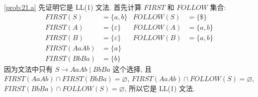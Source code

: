 \documentclass[boxes]{homework}
\begin{document}
\begin{solution}
    \ref{prob:21.a} 先证明它是 LL(1) 文法. 首先计算 $FIRST$ 和 $FOLLOW$ 集合:
    \begin{equation}
        \begin{aligned}
            FIRST(S)    & = \{a, b\}        & FOLLOW(S) & = \{\$\}   \\
            FIRST(A)    & = \{\varepsilon\} & FOLLOW(A) & = \{a, b\} \\
            FIRST(B)    & = \{\varepsilon\} & FOLLOW(B) & = \{a, b\} \\
            FIRST(AaAb) & = \{a\}                                    \\
            FIRST(BbBa) & = \{b\}
        \end{aligned}
    \end{equation}
    因为文法中只有 $S \to AaAb \mid BbBa$ 这个选择, 且 $FIRST(AaAb) \cap FIRST
        (BbBa) = \varnothing$, $FIRST(AaAb) \cap FOLLOW(S) = \varnothing$,
    $FIRST(BbBa) \cap FOLLOW(S) = \varnothing$, 所以它是 LL(1) 文法.


\end{solution}
\end{document}
